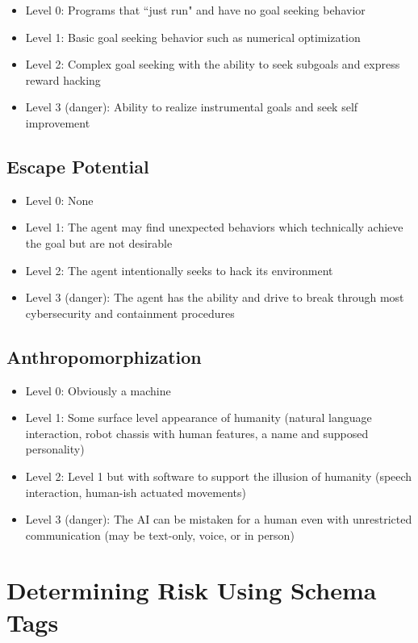 \documentclass[11pt]{article}
\begin{document}
\begin{itemize}
\item Level 0: Programs that ``just run" and have no goal seeking behavior 
\item Level 1: Basic goal seeking behavior such as numerical optimization
\item Level 2: Complex goal seeking with the ability to seek subgoals and express reward hacking
\item Level 3 (danger): Ability to realize instrumental goals and seek self improvement
\end{itemize}

\subsection{Escape Potential}

\begin{itemize}
\item Level 0: None
\item Level 1: The agent may find unexpected behaviors which technically achieve the goal but are not desirable
\item Level 2: The agent intentionally seeks to hack its environment
\item Level 3 (danger): The agent has the ability and drive to break through most cybersecurity and
                        containment procedures 
\end{itemize}

\subsection{Anthropomorphization}

\begin{itemize}
\item Level 0: Obviously a machine
\item Level 1: Some surface level appearance of humanity (natural language interaction, robot
        chassis with human features, a name and supposed personality) 
\item Level 2: Level 1 but with software to support the illusion of humanity (speech interaction,
        human-ish actuated movements) 
\item Level 3 (danger): The AI can be mistaken for a human even with unrestricted communication (may be
        text-only, voice, or in person) 
\end{itemize}

\newpage
\section{Determining Risk Using Schema Tags}
\label{sec:determining}
\end{document}
